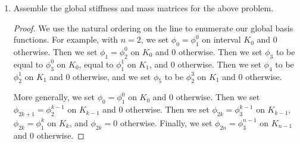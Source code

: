 \documentclass{article}
\begin{document}
\begin{enumerate}
\begin{proof}
		      so that
		      \[M = \frac{h}{30}\begin{pmatrix} 4 & -3 & -1 \\ -3 & 36 & -3 \\ -1 & -3 & 4 \end{pmatrix}.\]
	      \end{proof}
	\item Assemble the global stiffness and mass matrices for the above problem.
	      \begin{proof}
		      We use the natural ordering on the line to enumerate our global basis functions.
		      For example, with $n = 2$, we set $\phi_0 = \phi_1^0$ on interval $K_0$ and $0$ otherwise.
		      Then we set $\phi_1 = \phi_2^0$ on $K_0$ and $0$ otherwise.
		      Then we set $\phi_3$ to be equal to $\phi_3^0$ on $K_0$, equal to $\phi_1^1$ on $K_1$, and $0$ otherwise.
		      Then we set $\phi_4$ to be $\phi_2^1$ on $K_1$ and $0$ otherwise, and we set $\phi_5$ to be $\phi_2^3$ on $K_1$ and $0$ otherwise.

		      More generally, we set $\phi_0 = \phi_1^0$ on $K_0$ and $0$ otherwise.
		      Then we set $\phi_{2k+1} = \phi_2^{k-1}$ on $K_{k-1}$ and $0$ otherwise.
		      Then we set $\phi_{2k} = \phi_3^{k-1}$ on $K_{k-1}$, $\phi_{2k} = \phi_1^k$ on $K_k$, and $\phi_{2k} = 0$ otherwise.
		      Finally, we set $\phi_{2n} = \phi_3^{n-1}$ on $K_{n-1}$ and $0$ otherwise.


\end{proof}
\end{enumerate}
\end{document}
